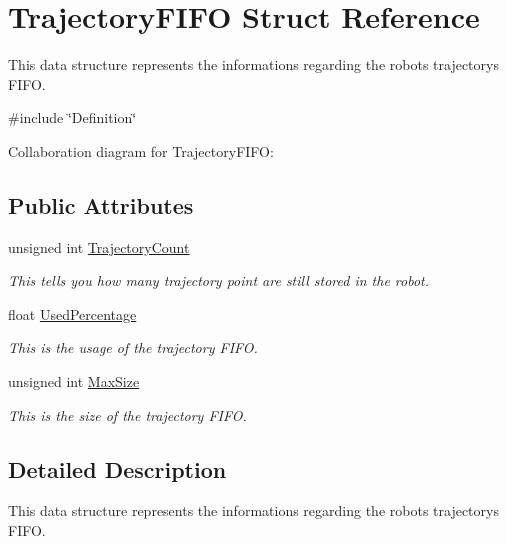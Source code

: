\hypertarget{struct_trajectory_f_i_f_o}{}\section{Trajectory\+F\+I\+FO Struct Reference}
\label{struct_trajectory_f_i_f_o}


This data structure represents the informations regarding the robot\textquotesingle{}s trajectory\textquotesingle{}s F\+I\+FO.  




{\ttfamily \#include \char`\"{}Definition\char`\"{}}



Collaboration diagram for Trajectory\+F\+I\+FO\+:
\subsection*{Public Attributes}
\begin{DoxyCompactItemize}
\item 
unsigned int \hyperlink{struct_trajectory_f_i_f_o_a8d2d82f71459128dd803eb7c9e09c2c6}{Trajectory\+Count}
\begin{DoxyCompactList}\small\item\em This tells you how many trajectory point are still stored in the robot. \end{DoxyCompactList}\item 
float \hyperlink{struct_trajectory_f_i_f_o_aa522f62f9f815f31be1d03c0b89653f5}{Used\+Percentage}
\begin{DoxyCompactList}\small\item\em This is the usage of the trajectory F\+I\+FO. \end{DoxyCompactList}\item 
unsigned int \hyperlink{struct_trajectory_f_i_f_o_ab57ade5bd66a71bfede38fb4d300d1d7}{Max\+Size}
\begin{DoxyCompactList}\small\item\em This is the size of the trajectory F\+I\+FO. \end{DoxyCompactList}\end{DoxyCompactItemize}


\subsection{Detailed Description}
This data structure represents the informations regarding the robot\textquotesingle{}s trajectory\textquotesingle{}s F\+I\+FO. 

